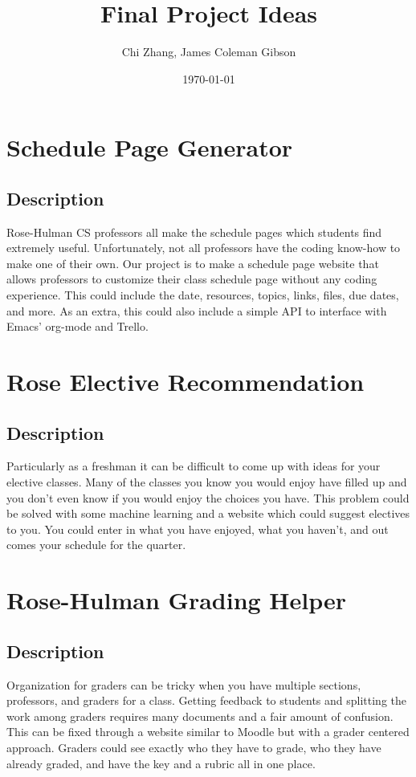 \documentclass{article}
\title{\Huge Final Project Ideas}
\author{\large Chi Zhang, James Coleman Gibson}
\date{\small \today}
\begin{document}
\maketitle

\section{Schedule Page Generator}
\subsection*{Description}
Rose-Hulman CS professors all make the schedule pages which students find
extremely useful. Unfortunately, not all professors have the coding know-how
to make one of their own. Our project is to make a schedule page website that
allows professors to customize their class schedule page without any coding
experience. This could include the date, resources, topics, links, files, due
dates, and more. As an extra, this could also include a simple API to interface
with Emacs' org-mode and Trello.

\section{Rose Elective Recommendation}
\subsection*{Description}
Particularly as a freshman it can be difficult to come up with ideas for your
elective classes. Many of the classes you know you would enjoy have filled up
and you don't even know if you would enjoy the choices you have. This problem
could be solved with some machine learning and a website which could suggest
electives to you. You could enter in what you have enjoyed, what you haven't,
and out comes your schedule for the quarter.

\section{Rose-Hulman Grading Helper}
\subsection*{Description}
Organization for graders can be tricky when you have multiple sections,
professors, and graders for a class. Getting feedback to students and splitting
the work among graders requires many documents and a fair amount of confusion.
This can be fixed through a website similar to Moodle but with a grader
centered approach. Graders could see exactly who they have to grade, who they
have already graded, and have the key and a rubric all in one place.
\end{document}
